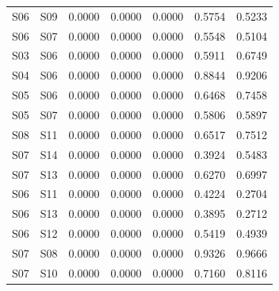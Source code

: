 \begin{table}
\begin{tabular}{llrrrrr}
S06 & S09 & 0.0000 & 0.0000 & 0.0000 & 0.5754 & 0.5233 \\
S06 & S07 & 0.0000 & 0.0000 & 0.0000 & 0.5548 & 0.5104 \\
S03 & S06 & 0.0000 & 0.0000 & 0.0000 & 0.5911 & 0.6749 \\
S04 & S06 & 0.0000 & 0.0000 & 0.0000 & 0.8844 & 0.9206 \\
S05 & S06 & 0.0000 & 0.0000 & 0.0000 & 0.6468 & 0.7458 \\
S05 & S07 & 0.0000 & 0.0000 & 0.0000 & 0.5806 & 0.5897 \\
S08 & S11 & 0.0000 & 0.0000 & 0.0000 & 0.6517 & 0.7512 \\
S07 & S14 & 0.0000 & 0.0000 & 0.0000 & 0.3924 & 0.5483 \\
S07 & S13 & 0.0000 & 0.0000 & 0.0000 & 0.6270 & 0.6997 \\
S06 & S11 & 0.0000 & 0.0000 & 0.0000 & 0.4224 & 0.2704 \\
S06 & S13 & 0.0000 & 0.0000 & 0.0000 & 0.3895 & 0.2712 \\
S06 & S12 & 0.0000 & 0.0000 & 0.0000 & 0.5419 & 0.4939 \\
S07 & S08 & 0.0000 & 0.0000 & 0.0000 & 0.9326 & 0.9666 \\
S07 & S10 & 0.0000 & 0.0000 & 0.0000 & 0.7160 & 0.8116 \\
\bottomrule
\end{tabular}
\end{table}
